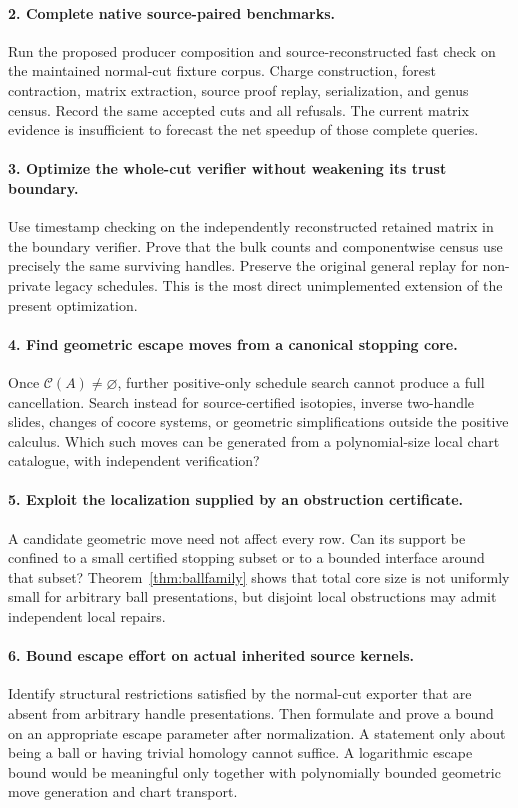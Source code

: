 \documentclass[11pt]{article}
\theoremstyle{definition}\newtheorem{definition}[theorem]{Definition}
\theoremstyle{remark}\newtheorem{remark}[theorem]{Remark}
\newcommand{\core}{\mathcal C}
\begin{document}
\paragraph{2. Complete native source-paired benchmarks.}
Run the proposed producer composition and source-reconstructed fast check on the maintained normal-cut fixture corpus. Charge construction, forest contraction, matrix extraction, source proof replay, serialization, and genus census. Record the same accepted cuts and all refusals. The current matrix evidence is insufficient to forecast the net speedup of those complete queries.

\paragraph{3. Optimize the whole-cut verifier without weakening its trust boundary.}
Use timestamp checking on the independently reconstructed retained matrix in the boundary verifier. Prove that the bulk counts and componentwise census use precisely the same surviving handles. Preserve the original general replay for non-private legacy schedules. This is the most direct unimplemented extension of the present optimization.

\paragraph{4. Find geometric escape moves from a canonical stopping core.}
Once $\core(A)\ne\varnothing$, further positive-only schedule search cannot produce a full cancellation. Search instead for source-certified isotopies, inverse two-handle slides, changes of cocore systems, or geometric simplifications outside the positive calculus. Which such moves can be generated from a polynomial-size local chart catalogue, with independent verification?

\paragraph{5. Exploit the localization supplied by an obstruction certificate.}
A candidate geometric move need not affect every row. Can its support be confined to a small certified stopping subset or to a bounded interface around that subset? Theorem~\ref{thm:ballfamily} shows that total core size is not uniformly small for arbitrary ball presentations, but disjoint local obstructions may admit independent local repairs.

\paragraph{6. Bound escape effort on actual inherited source kernels.}
Identify structural restrictions satisfied by the normal-cut exporter that are absent from arbitrary handle presentations. Then formulate and prove a bound on an appropriate escape parameter after normalization. A statement only about being a ball or having trivial homology cannot suffice. A logarithmic escape bound would be meaningful only together with polynomially bounded geometric move generation and chart transport.
\end{document}
